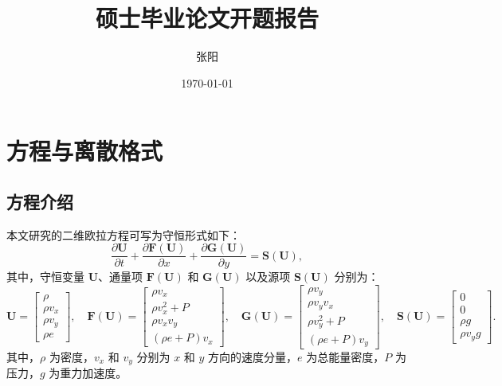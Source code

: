 \documentclass{article}
\title{硕士毕业论文开题报告}
\date{\today}
\author{张阳}
\numberwithin{equation}{section}    %
\begin{document}
\maketitle
\tableofcontents
\newpage

\section{方程与离散格式}
\subsection{方程介绍}
本文研究的二维欧拉方程可写为守恒形式如下：
\begin{equation}
    \frac{\partial \mathbf{U}}{\partial t}
    + \frac{\partial \mathbf{F}(\mathbf{U})}{\partial x}
    + \frac{\partial \mathbf{G}(\mathbf{U})}{\partial y}
    = \mathbf{S}(\mathbf{U}),
\end{equation}
其中，守恒变量 $\mathbf{U}$、通量项 $\mathbf{F}(\mathbf{U})$ 和 $\mathbf{G}(\mathbf{U})$ 以及源项 $\mathbf{S}(\mathbf{U})$ 分别为：
\begin{equation}
\mathbf{U} = \begin{bmatrix}
\rho       \\
\rho v_{x} \\
\rho v_{y} \\
\rho e
\end{bmatrix}, \quad
\mathbf{F}(\mathbf{U}) = \begin{bmatrix}
\rho v_{x}       \\
\rho v_{x}^{2}+P \\
\rho v_{x} v_{y} \\
(\rho e+P) v_{x}
\end{bmatrix}, \quad
\mathbf{G}(\mathbf{U}) = \begin{bmatrix}
\rho v_{y}       \\
\rho v_{y} v_{x} \\
\rho v_{y}^{2}+P \\
(\rho e+P) v_{y}
\end{bmatrix}, \quad
\mathbf{S}(\mathbf{U}) = \begin{bmatrix}
0      \\
0      \\
\rho g \\
\rho v_{y} g
\end{bmatrix}.
\end{equation}
其中，$\rho$ 为密度，$v_x$ 和 $v_y$ 分别为 $x$ 和 $y$ 方向的速度分量，$e$ 为总能量密度，$P$ 为压力，$g$ 为重力加速度。
\end{document}
